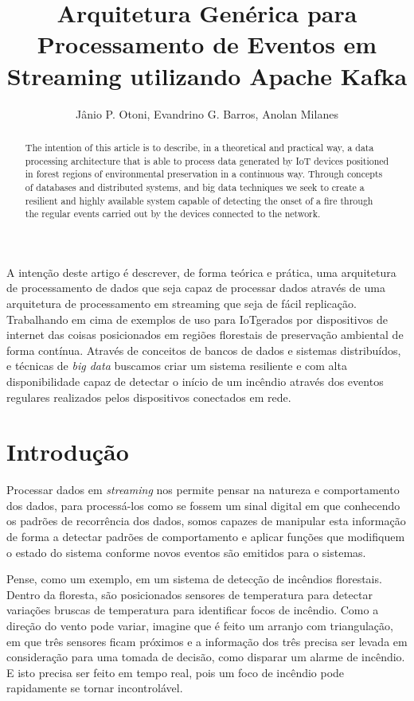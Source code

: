 \documentclass[12pt]{article}
\title{Arquitetura Genérica para Processamento de Eventos em Streaming utilizando Apache Kafka}
\author{Jânio P. Otoni\inst{1}, Evandrino G. Barros\inst{1}, Anolan Milanes\inst{2}}
\begin{document}
 

\maketitle

\begin{abstract}
  The intention of this article is to describe, in a theoretical and practical way, a data processing architecture that is able to process data generated by IoT devices positioned in forest regions of environmental preservation in a continuous way. Through concepts of databases and distributed systems, and big data techniques we seek to create a resilient and highly available system capable of detecting the onset of a fire through the regular events carried out by the devices connected to the network.
\end{abstract}
     
\begin{resumo} 
  A intenção deste artigo é descrever, de forma teórica e prática, uma arquitetura de processamento de dados que seja capaz de processar dados através de uma arquitetura de processamento em streaming que seja de fácil replicação. Trabalhando em cima de exemplos de uso para IoTgerados por dispositivos de internet das coisas posicionados em regiões florestais de preservação ambiental de forma contínua. Através de conceitos de bancos de dados e sistemas distribuídos, e técnicas de \textit{big data} buscamos criar um sistema resiliente e com alta disponibilidade capaz de detectar o início de um incêndio através dos eventos regulares realizados pelos dispositivos conectados em rede.
\end{resumo}



\section{Introdução}
Processar dados em \textit{streaming} nos permite pensar na natureza e comportamento dos dados, para processá-los como se fossem um sinal digital em que conhecendo os padrões de recorrência dos dados, somos capazes de manipular esta informação de forma a detectar padrões de comportamento e aplicar funções que modifiquem o estado do sistema conforme novos eventos são emitidos para o sistemas.

Pense, como um exemplo, em um sistema de detecção de incêndios florestais. Dentro da floresta, são posicionados sensores de temperatura para detectar variações bruscas de temperatura para identificar focos de incêndio. Como a direção do vento pode variar, imagine que é feito um arranjo com triangulação, em que três sensores ficam próximos e a informação dos três precisa ser levada em consideração para uma tomada de decisão, como disparar um alarme de incêndio. E isto precisa ser feito em tempo real, pois um foco de incêndio pode rapidamente se tornar incontrolável.
\end{document}
